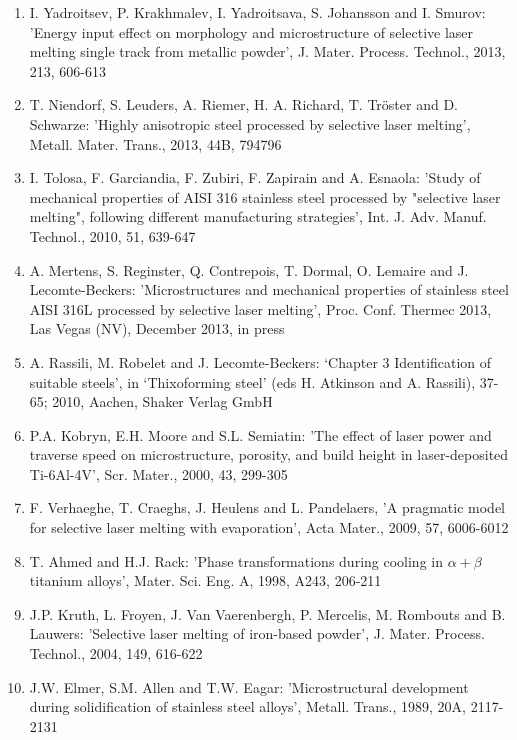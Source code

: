 \documentclass[10pt]{article}
\begin{document}
\begin{enumerate}
  \item I. Yadroitsev, P. Krakhmalev, I. Yadroitsava, S. Johansson and I. Smurov: 'Energy input effect on morphology and microstructure of selective laser melting single track from metallic powder', J. Mater. Process. Technol., 2013, 213, 606-613

  \item T. Niendorf, S. Leuders, A. Riemer, H. A. Richard, T. Tröster and D. Schwarze: 'Highly anisotropic steel processed by selective laser melting', Metall. Mater. Trans., 2013, 44B, 794796

  \item I. Tolosa, F. Garciandia, F. Zubiri, F. Zapirain and A. Esnaola: 'Study of mechanical properties of AISI 316 stainless steel processed by "selective laser melting", following different manufacturing strategies’, Int. J. Adv. Manuf. Technol., 2010, 51, 639-647

  \item A. Mertens, S. Reginster, Q. Contrepois, T. Dormal, O. Lemaire and J. Lecomte-Beckers: 'Microstructures and mechanical properties of stainless steel AISI 316L processed by selective laser melting', Proc. Conf. Thermec 2013, Las Vegas (NV), December 2013, in press

  \item A. Rassili, M. Robelet and J. Lecomte-Beckers: ‘Chapter 3 Identification of suitable steels’, in ‘Thixoforming steel’ (eds H. Atkinson and A. Rassili), 37-65; 2010, Aachen, Shaker Verlag GmbH

  \item P.A. Kobryn, E.H. Moore and S.L. Semiatin: 'The effect of laser power and traverse speed on microstructure, porosity, and build height in laser-deposited Ti-6Al-4V', Scr. Mater., 2000, 43, 299-305

  \item F. Verhaeghe, T. Craeghs, J. Heulens and L. Pandelaers, 'A pragmatic model for selective laser melting with evaporation’, Acta Mater., 2009, 57, 6006-6012

  \item T. Ahmed and H.J. Rack: 'Phase transformations during cooling in $\alpha+\beta$ titanium alloys', Mater. Sci. Eng. A, 1998, A243, 206-211

  \item J.P. Kruth, L. Froyen, J. Van Vaerenbergh, P. Mercelis, M. Rombouts and B. Lauwers: 'Selective laser melting of iron-based powder', J. Mater. Process. Technol., 2004, 149, 616-622

  \item J.W. Elmer, S.M. Allen and T.W. Eagar: 'Microstructural development during solidification of stainless steel alloys', Metall. Trans., 1989, 20A, 2117-2131

\end{enumerate}
\end{document}
